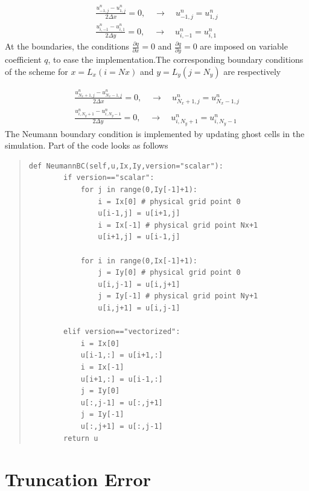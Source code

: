 \documentclass[twoside]{article}
\begin{document}
\begin{align}
\frac{u_{-1,j}^n-u_{1,j}^n}{2\Delta x} = 0,\quad \rightarrow \quad u_{-1,j}^n = u_{1,j}^n\label{eqn:boundx0}\\
\frac{u_{i,-1}^n-u_{i,1}^n}{2\Delta y} = 0,\quad \rightarrow \quad u_{i,-1}^n = u_{i,1}^n\label{eqn:boundy0}
\end{align}
At the boundaries, the conditions $\frac{\partial q}{\partial x}=0$ and $\frac{\partial q}{\partial y}=0$ are imposed on variable coefficient $q$, to ease the implementation.The corresponding boundary conditions of the scheme for $x=L_x (i=Nx)$ and $y=L_y (j=N_y)$ are respectively

\begin{align}
\frac{u_{N_x+1,j}^n-u_{N_x-1,j}^n}{2\Delta x} = 0,\quad \rightarrow \quad u_{N_x+1,j}^n = u_{N_x-1,j}^n\label{eqn:boundx0}\\
\frac{u_{i,N_y+1}^n-u_{i,N_y-1}^n}{2\Delta y} = 0,\quad \rightarrow \quad u_{i,N_y+1}^n = u_{i,N_y-1}^n\label{eqn:boundy0}
\end{align}
The Neumann boundary condition is implemented by updating ghost cells in the simulation. Part of the code looks as follows

\begin{quote}
\begin{verbatim}
def NeumannBC(self,u,Ix,Iy,version="scalar"):
        if version=="scalar":
            for j in range(0,Iy[-1]+1):
                i = Ix[0] # physical grid point 0
                u[i-1,j] = u[i+1,j] 
                i = Ix[-1] # physical grid point Nx+1
                u[i+1,j] = u[i-1,j]
                
            for i in range(0,Ix[-1]+1):
                j = Iy[0] # physical grid point 0
                u[i,j-1] = u[i,j+1]
                j = Iy[-1] # physical grid point Ny+1
                u[i,j+1] = u[i,j-1]
                        
        elif version=="vectorized":
            i = Ix[0]
            u[i-1,:] = u[i+1,:]
            i = Ix[-1]
            u[i+1,:] = u[i-1,:]
            j = Iy[0]  
            u[:,j-1] = u[:,j+1]
            j = Iy[-1]
            u[:,j+1] = u[:,j-1]
        return u
\end{verbatim}
\end{quote}

\section{Truncation Error}
\end{document}
